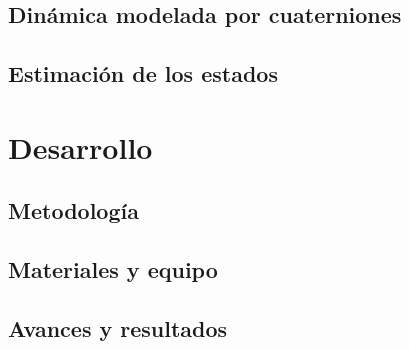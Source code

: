\documentclass[a4paper,12pt, oneside]{book}
\begin{document}
		\chapter{Dinámica modelada por cuaterniones} \label{chap:cuaterniones}
		
		
		\chapter{Estimación de los estados} \label{chap:estimacion}
		
		
	\part{Desarrollo}
%		
		
		\chapter{Metodología} \label{chap:Metodologia}
		
		
		\chapter{Materiales y equipo} \label{chap:Materiales}
		
		
		\chapter{Avances y resultados} \label{chap:Avances y resultados}
		
		
%		
		
\end{document}
